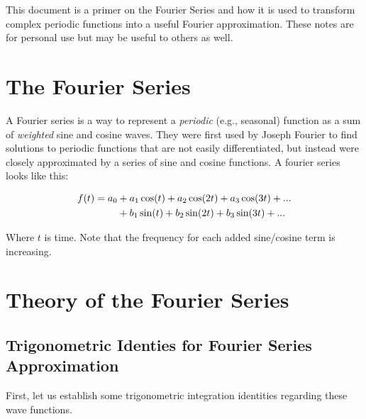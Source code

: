 \documentclass[10pt]{article} %
\begin{document}
\tableofcontents
\vspace{1cm}

This document is a primer on the Fourier Series and how it is used to transform complex periodic functions into a useful Fourier approximation. These notes are for personal use but may be useful to others as well.

\section{The Fourier Series}

A Fourier series is a way to represent a \textit{periodic} (e.g., seasonal) function as a sum of \textit{weighted} sine and cosine waves. They were first used by Joseph Fourier to find solutions to periodic functions that are not easily differentiated, but instead were closely approximated by a series of sine and cosine functions. A fourier series looks like this:

\begin{align}
f(t) = a_0 & + a_1\cos(t) + a_2\cos(2t) + a_3\cos(3t) + ... \\
           & + b_1\sin(t) + b_2\sin(2t) + b_3\sin(3t) + ... \notag
\end{align}

Where $t$ is time. Note that the frequency for each added sine/cosine term is increasing.

\section{Theory of the Fourier Series}

\subsection{Trigonometric Identies for Fourier Series Approximation}

First, let us establish some trigonometric integration identities regarding these wave functions.
\end{document}
